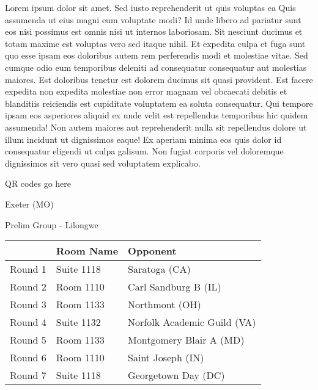 \documentclass{article}%
\begin{document}
\vspace*{8pt}%
\linebreak%
\newline%
\newline%
Lorem ipsum dolor sit amet. Sed iusto reprehenderit ut quis voluptas ea Quis assumenda ut eius magni eum voluptate modi? Id unde libero ad pariatur sunt eos nisi possimus est omnis nisi ut internos laboriosam. Sit nesciunt ducimus et totam maxime est voluptas vero sed itaque nihil. Et expedita culpa et fuga sunt quo esse ipsam eos doloribus autem rem perferendis modi et molestiae vitae.\newline%
\newline%
Sed cumque odio eum temporibus deleniti ad consequatur consequatur aut molestias maiores. Est doloribus tenetur est dolorem ducimus sit quasi provident. Est facere expedita non expedita molestiae non error magnam vel obcaecati debitis et blanditiis reiciendis est cupiditate voluptatem ea soluta consequatur. Qui tempore ipsam eos asperiores aliquid ex unde velit est repellendus temporibus hic quidem assumenda!\newline%
\newline%
Non autem maiores aut reprehenderit nulla sit repellendus dolore ut illum incidunt ut dignissimos eaque! Ex aperiam minima eos quis dolor id consequatur eligendi ut culpa galisum. Non fugiat corporis vel doloremque dignissimos sit vero quasi sed voluptatem explicabo.\newline%
\newline%
%
\vspace*{30pt}%
\begin{center}%
\begin{Huge}%
QR codes go here%
\end{Huge}%
\end{center}%
\newpage%
%
\begin{center}%
\begin{Huge}%
Exeter (MO)%
\end{Huge}%
\vspace*{8pt}%
\linebreak%
\begin{Large}%
Prelim Group {-} Lilongwe%
\end{Large}%
\end{center}%
\begin{tabularx}{\textwidth}{|c|Y|Y|}%
\hline%
&Room Name&Opponent\\%
\hline%
Round 1&Suite 1118&Saratoga (CA)\\%
Round 2&Room 1110&Carl Sandburg B (IL)\\%
Round 3&Room 1133&Northmont (OH)\\%
Round 4&Suite 1132&Norfolk Academic Guild (VA)\\%
Round 5&Room 1133&Montgomery Blair A (MD)\\%
Round 6&Room 1110&Saint Joseph (IN)\\%
Round 7&Suite 1118&Georgetown Day (DC)\\%
\hline%
\end{tabularx}%
\end{document}
